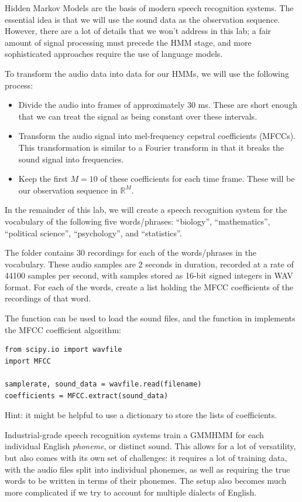 Hidden Markov Models are the basis of modern speech recognition systems.
The essential idea is that we will use the sound data as the observation sequence.
However, there are a lot of details that we won't address in this lab; a fair amount of signal processing must precede the HMM stage, and more sophisticated approaches require the use of language models.

To transform the audio data into data for our HMMs, we will use the following process:
\begin{itemize}
\item Divide the audio into frames of approximately 30 ms. These are short enough that we can treat the signal as being constant over these intervals. 
\item Transform the audio signal into mel-frequency cepstral coefficients (MFCCs). This transformation is similar to a Fourier transform in that it breaks the sound signal into frequencies. 
\item Keep the first $M=10$ of these coefficients for each time frame. These will be our observation sequence in $\mathbb{R}^M$.
\end{itemize}

\begin{problem}
In the remainder of this lab, we will create a speech recognition system for the vocabulary of the following five words/phrases: ``biology'', ``mathematics'', ``political science'', ``psychology'', and ``statistics''.

The  folder contains 30 recordings for each of the words/phrases in the vocabulary.
These audio samples are 2 seconds in duration, recorded at a rate of 44100 samples per second, with samples stored as 16-bit signed integers in WAV format. 
For each of the words, create a list holding the MFCC coefficients of the recordings of that word.

The function  can be used to load the sound files, and the function  in  implements the MFCC coefficient algorithm:
\begin{lstlisting}
from scipy.io import wavfile
import MFCC

samplerate, sound_data = wavfile.read(filename)
coefficients = MFCC.extract(sound_data)
\end{lstlisting}
Hint: it might be helpful to use a dictionary to store the lists of coefficients.
\end{problem}

Industrial-grade speech recognition systems train a GMMHMM for each individual English \emph{phoneme}, or distinct sound.
This allows for a lot of versatility, but also comes with its own set of challenges: it requires a lot of training data, with the audio files split into individual phonemes, as well as requiring the true words to be written in terms of their phonemes.
The setup also becomes much more complicated if we try to account for multiple dialects of English.

